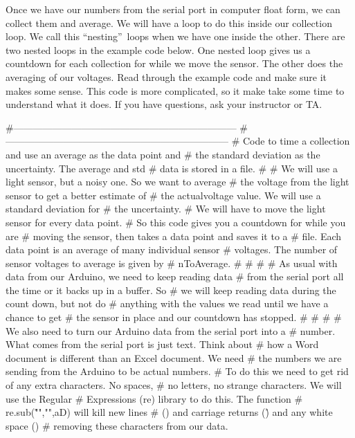 Once we have our numbers from the serial port in computer float form, we can
collect them and average. We will have a loop to do this inside our
collection loop. We call this \textquotedblleft nesting\textquotedblright\
loops when we have one inside the other. There are two nested loops in the
example code below. One nested loop gives us a countdown for each collection
for while we move the sensor. The other does the averaging of our voltages.
Read through the example code and make sure it makes some sense. This code
is more complicated, so it make take some time to understand what it does.
If you have questions, ask your instructor or TA.
\begin{python}
#---------------------------------------------------------------------
#---------------------------------------------------------------------
#  Code to time a collection and use an average as the data point and  
#   the standard deviation as the uncertainty. The average and std  
#   data is stored in a file.
#
#  We will use a light sensor, but a noisy one. So we want to average 
#    the voltage from the light sensor to get a better estimate of 
#    the actualvoltage value. We will use a standard deviation for 
#    the uncertainty.
#  We will have to move the light sensor for every data point. 
#    So this code gives you a countdown for while you are 
#    moving the sensor, then takes a data point and saves it to a 
#    file. Each data point is an average of many individual sensor 
#    voltages. The number of sensor voltages to average is given by 
#    nToAverage.
# # # 
#  As usual with data from our Arduino, we need to keep reading data 
#    from the serial port all the time or it backs up in a buffer. So 
#    we will keep reading data during the count down, but not do  
#    anything with the values we read until we have a chance to get  
#    the sensor in place and our countdown has stopped.
# # #
#  We also need to turn our Arduino data from the serial port into a 
#    number. What comes from the serial port is just text. Think about 
#    how a Word document is different than an Excel document. We need 
#    the numbers we are sending from the Arduino to be actual numbers.  
#    To do this we need to get rid of any extra characters. No spaces, 
#    no letters, no strange characters. We will use the Regular  
#    Expressions (re) library to do this. The function  
#    re.sub("\n\r\s","",aD) will kill new lines 
#    (\n) and carriage returns (\r) and any white space (\s) 
#	 removing these characters from our data.
 

\end{python}
